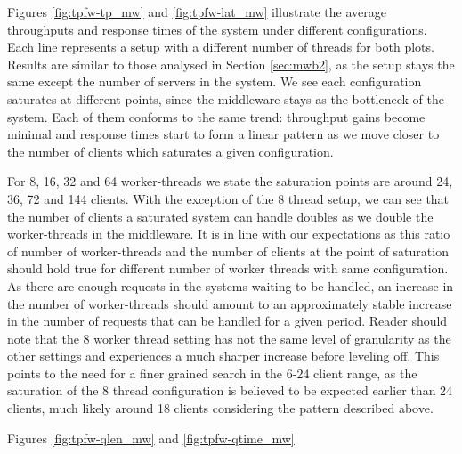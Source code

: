 \documentclass[11pt,a4paper]{article}
\begin{document}
Figures \ref{fig:tpfw-tp_mw} and \ref{fig:tpfw-lat_mw} illustrate the average throughputs and response times of the system under different configurations. Each line represents a setup with a different number of threads for both plots. Results are similar to those analysed in Section \ref{sec:mwb2}, as the setup stays the same except the number of servers in the system. We see each configuration saturates at different points, since the middleware stays as the bottleneck of the system. Each of them conforms to the same trend: throughput gains become minimal and response times start to form a linear pattern as we move closer to the number of clients which saturates a given configuration. 
\par For 8, 16, 32 and 64 worker-threads we state the saturation points are around 24, 36, 72 and 144 clients. With the exception of the 8 thread setup, we can see that the number of clients a saturated system can handle doubles as we double the worker-threads in the middleware. It is in line with our expectations as this ratio of number of worker-threads and the number of clients at the point of saturation should hold true for different number of worker threads with same configuration. As there are enough requests in the systems waiting to be handled, an increase in the number of worker-threads should amount to an approximately stable increase in the number of requests that can be handled for a given period. Reader should note that the 8 worker thread setting has not the same level of granularity as the other settings and experiences a much sharper increase before leveling off. This points to the need for a finer grained search in the 6-24 client range, as the saturation of the 8 thread configuration is believed to be expected earlier than 24 clients, much likely around 18 clients considering the pattern described above.
\par Figures \ref{fig:tpfw-qlen_mw} and \ref{fig:tpfw-qtime_mw}
\end{document}
